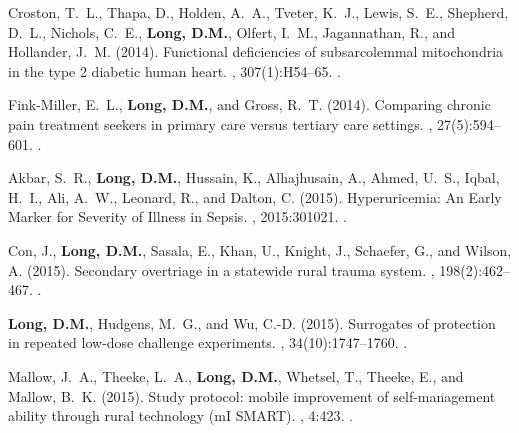 \begin{thebibliography}{}
Croston, T.~L., Thapa, D., Holden, A.~A., Tveter, K.~J., Lewis, S.~E.,
  Shepherd, D.~L., Nichols, C.~E., \textbf{Long, D.M.}, Olfert, I.~M., Jagannathan, R.,
  and Hollander, J.~M. (2014).
\newblock Functional deficiencies of subsarcolemmal mitochondria in the type 2
  diabetic human heart.
, 307(1):H54--65.
.  

Fink-Miller, E.~L., \textbf{Long, D.M.}, and Gross, R.~T. (2014).
\newblock Comparing chronic pain treatment seekers in primary care versus
  tertiary care settings.
,
  27(5):594--601.
.  

Akbar, S.~R., \textbf{Long, D.M.}, Hussain, K., Alhajhusain, A., Ahmed, U.~S., Iqbal,
  H.~I., Ali, A.~W., Leonard, R., and Dalton, C. (2015).
\newblock Hyperuricemia: {An} {Early} {Marker} for {Severity} of {Illness} in
  {Sepsis}.
, 2015:301021.
.  

Con, J., \textbf{Long, D.M.}, Sasala, E., Khan, U., Knight, J., Schaefer, G., and Wilson, A. (2015).
\newblock Secondary overtriage in a statewide rural trauma system.
, 198(2):462--467.
.  

\textbf{Long, D.M.}, Hudgens, M.~G., and Wu, C.-D. (2015).
\newblock Surrogates of protection in repeated low-dose challenge experiments.
, 34(10):1747--1760.
.  

Mallow, J.~A., Theeke, L.~A., \textbf{Long, D.M.}, Whetsel, T., Theeke, E., and Mallow,
  B.~K. (2015).
\newblock Study protocol: mobile improvement of self-management ability through
  rural technology ({mI} {SMART}).
, 4:423.
.  



\end{thebibliography}
